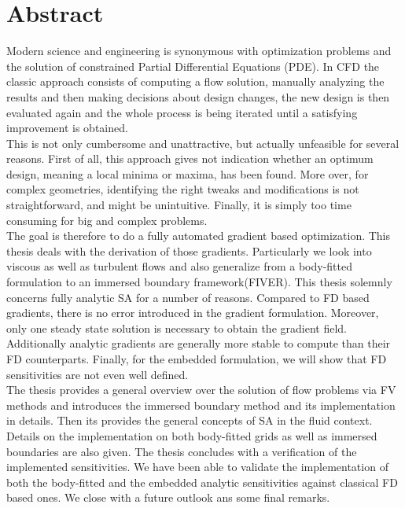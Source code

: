 \section*{Abstract}
Modern science and engineering is synonymous with optimization problems and the solution of constrained Partial Differential Equations (PDE).
In \acf{CFD} the classic approach consists of computing a flow solution, manually analyzing the results and then making decisions about design changes, the new design is then evaluated again and the whole process is being iterated until a satisfying improvement is obtained.\\
This is not only cumbersome and unattractive, but actually unfeasible for several reasons. First of all, this approach gives not indication whether an optimum design, meaning a local minima or maxima, has been found. More over, for complex geometries, identifying the right tweaks and modifications is not straightforward, and might be unintuitive. Finally, it is simply too time consuming for big and complex problems.\\
The goal is therefore to do a fully automated gradient based optimization. This thesis deals with the derivation of those gradients. Particularly we look into viscous as well as turbulent flows and also generalize from a body-fitted formulation to an immersed boundary framework(FIVER). This thesis solemnly concerns fully analytic \acf{SA} for a number of reasons. Compared to \acf{FD} based gradients, there is no error introduced in the gradient formulation. Moreover, only one steady state solution is necessary to obtain the gradient field. Additionally analytic gradients are generally more stable to compute than their \acf{FD} counterparts. Finally, for the embedded formulation, we will show that \ac{FD} sensitivities are not even well defined.\\
The thesis provides a general overview over the solution of flow problems via \ac{FV} methods and introduces the immersed boundary method and its implementation in details. Then its provides the general concepts of \ac{SA} in the fluid context. Details on the implementation on both body-fitted grids as well as immersed boundaries are also given.  The thesis concludes with a verification of the implemented sensitivities. We have been able to validate the implementation of both the body-fitted and the embedded analytic sensitivities against classical \ac{FD} based ones. We close with a future outlook ans some final remarks.


\newpage


